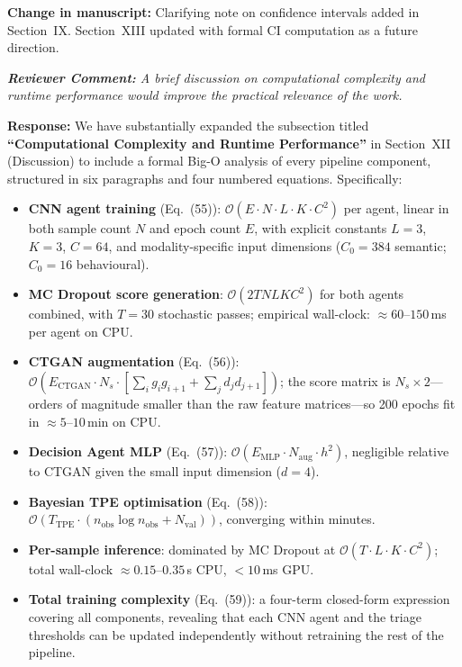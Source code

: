 \documentclass[11pt,a4paper]{article}
\newcommand{\RC}[1]{\begin{reviewbox}\textit{\textbf{Reviewer Comment:} #1}\end{reviewbox}}
\newcommand{\RS}[1]{\noindent\textcolor{responsegreen}{\textbf{Response:}} #1\par\medskip}
\newcommand{\CH}[1]{\noindent\textcolor{changebrown}{\textbf{Change in manuscript:}} #1\par\bigskip}
\begin{document}
\CH{Clarifying note on confidence intervals added in Section~IX.
Section~XIII updated with formal CI computation as a future direction.}

\RC{A brief discussion on computational complexity and runtime performance would
improve the practical relevance of the work.}

\RS{We have substantially expanded the subsection titled \textbf{``Computational
Complexity and Runtime Performance''} in Section~XII (Discussion) to include a
formal Big-O analysis of every pipeline component, structured in six paragraphs
and four numbered equations.
Specifically:
\begin{itemize}[leftmargin=1.5em,itemsep=2pt]
  \item \textbf{CNN agent training} (Eq.~(55)):
        $\mathcal{O}(E \cdot N \cdot L \cdot K \cdot C^2)$ per agent, linear in
        both sample count $N$ and epoch count $E$, with explicit constants
        $L=3$, $K=3$, $C=64$, and modality-specific input dimensions
        ($C_0=384$ semantic; $C_0=16$ behavioural).
  \item \textbf{MC Dropout score generation}:
        $\mathcal{O}(2 T N L K C^2)$ for both agents combined, with $T=30$
        stochastic passes; empirical wall-clock: $\approx 60$--$150$\,ms per
        agent on CPU.
  \item \textbf{CTGAN augmentation} (Eq.~(56)):
        $\mathcal{O}(E_{\mathrm{CTGAN}} \cdot N_s \cdot
        [\sum_i g_i g_{i+1} + \sum_j d_j d_{j+1}])$; the score matrix is
        $N_s \times 2$---orders of magnitude smaller than the raw feature
        matrices---so 200 epochs fit in $\approx 5$--$10$\,min on CPU.
  \item \textbf{Decision Agent MLP} (Eq.~(57)):
        $\mathcal{O}(E_{\mathrm{MLP}} \cdot N_{\mathrm{aug}} \cdot h^2)$,
        negligible relative to CTGAN given the small input dimension ($d=4$).
  \item \textbf{Bayesian TPE optimisation} (Eq.~(58)):
        $\mathcal{O}(T_{\mathrm{TPE}} \cdot (n_{\mathrm{obs}} \log n_{\mathrm{obs}}
        + N_{\mathrm{val}}))$, converging within minutes.
  \item \textbf{Per-sample inference}: dominated by MC Dropout at
        $\mathcal{O}(T \cdot L \cdot K \cdot C^2)$; total wall-clock
        $\approx 0.15$--$0.35$\,s CPU, $<10$\,ms GPU.
  \item \textbf{Total training complexity} (Eq.~(59)):
        a four-term closed-form expression covering all components, revealing
        that each CNN agent and the triage thresholds can be updated independently
        without retraining the rest of the pipeline.
\end{itemize}}
\end{document}
